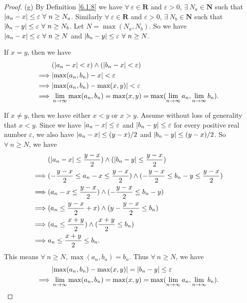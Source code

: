\begin{proof}{(g)}
By Definition \ref{6.1.8} we have \(\forall\ \varepsilon \in \mathbf{R}\) and \(\varepsilon > 0\), \(\exists\ N_a \in \mathbf{N}\) such that \(\abs*{a_n - x} \leq \varepsilon \ \forall\ n \geq N_a\).
Similarly \(\forall\ \varepsilon \in \mathbf{R}\) and \(\varepsilon > 0\), \(\exists\ N_b \in \mathbf{N}\) such that \(\abs*{b_n - y} \leq \varepsilon \ \forall\ n \geq N_b\).
Let \(N = \max(N_a, N_b)\).
So we have \(\abs*{a_n - x} \leq \varepsilon \ \forall\ n \geq N\) and \(\abs*{b_n - y} \leq \varepsilon \ \forall\ n \geq N\).

If \(x = y\), then we have
\begin{align*}
& (\abs*{a_n - x} < \varepsilon) \land (\abs*{b_n - x} < \varepsilon) \\
\implies & \abs*{\max(a_n, b_n) - x} < \varepsilon \\
\implies & \abs*{\max(a_n, b_n) - \max(x, y)} < \varepsilon \\
\implies & \lim_{n \to \infty} \max(a_n, b_n) = \max(x, y) = \max(\lim_{n \to \infty} a_n, \lim_{n \to \infty} b_n).
\end{align*}

If \(x \neq y\), then we have either \(x < y\) or \(x > y\).
Assume without loss of generality that \(x < y\).
Since we have \(\abs*{a_n - x} \leq \varepsilon\) and \(\abs*{b_n - y} \leq \varepsilon\) for every positive real number \(\varepsilon\), we also have \(\abs*{a_n - x} \leq (y - x) / 2\) and \(\abs*{b_n - y} \leq (y - x) / 2\).
So \(\forall\ n \geq N\), we have
\begin{align*}
& (\abs*{a_n - x} \leq \frac{y - x}{2}) \land (\abs*{b_n - y} \leq \frac{y - x}{2}) \\
\implies & (-\frac{y - x}{2} \leq a_n - x \leq \frac{y - x}{2}) \land (-\frac{y - x}{2} \leq b_n - y \leq \frac{y - x}{2}) \\
\implies & (a_n - x \leq \frac{y - x}{2}) \land (-\frac{y - x}{2} \leq b_n - y) \\
\implies & (a_n \leq \frac{y - x}{2} + x) \land (y - \frac{y - x}{2} \leq b_n) \\
\implies & (a_n \leq \frac{x + y}{2}) \land (\frac{x + y}{2} \leq b_n) \\
\implies & a_n \leq \frac{x + y}{2} \leq b_n.
\end{align*}
This means \(\forall\ n \geq N, \max(a_n, b_n) = b_n\).
Thus \(\forall\ n \geq N\), we have
\begin{align*}
& \abs*{\max(a_n, b_n) - \max(x, y)} = \abs*{b_n - y} \leq \varepsilon \\
\implies & \lim_{n \to \infty} \max(a_n, b_n) = \max(x, y) = \max(\lim_{n \to \infty} a_n, \lim_{n \to \infty} b_n).
\end{align*}
\end{proof}

